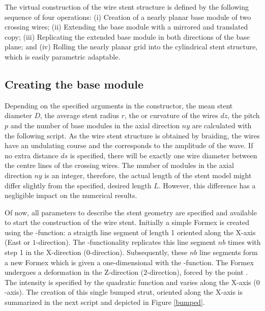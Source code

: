 The virtual construction of the wire stent structure is defined by the following sequence of four operations: (i) Creation of a nearly planar base module of two crossing wires; (ii) Extending the base module with a mirrored and translated copy; (iii) Replicating the extended base module in both directions of the base plane; and (iv) Rolling the nearly planar grid into the cylindrical stent structure, which is easily parametric adaptable.

\subsection{Creating the base module}

Depending on the specified arguments in the constructor, the mean stent diameter $D$, the average stent radius $r$, the  or curvature of the wires $dz$, the pitch $p$ and the number of base modules in the axial direction $ny$ are calculated with the following script. As the wire stent structure is obtained by braiding, the wires have an undulating course and the  corresponds to the amplitude of the wave. If no extra distance $ds$ is specified, there will be exactly one wire diameter between the centre lines of the crossing wires. The number of modules in the axial direction $ny$ is an integer, therefore, the actual length of the stent model might differ slightly from the specified, desired length $L$. However, this difference has a negligible impact on the numerical results.



Of now, all parameters to describe the stent geometry are specified and available to start the construction of the wire stent. Initially a simple Formex is created using the -function: a straigth line segment of length 1 oriented along the X-axis (East or $1$-direction). The -functionality replicates this line segment $nb$ times with step {1} in the X-direction ($0$-direction). Subsequently, these $nb$ line segments form a new Formex which is given a one-dimensional  with the -function. The Formex undergoes a deformation in the Z-direction ($2$-direction), forced by the point \code{[0,0,dz]}. The  intensity is specified by the quadratic  function and varies along the X-axis ($0$-axis). The creation of this single bumped strut, oriented along the X-axis is summarized in the next script and depicted in Figure \ref{bumped}.

